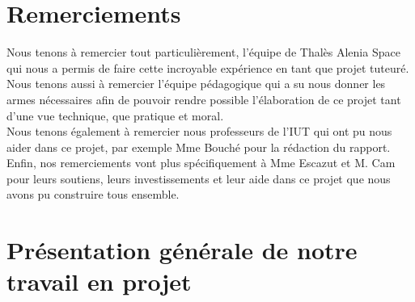 \documentclass{PackagerQualityN}
\begin{document}
\newp       %
\setcounter{tocdepth}{2}
\tableofcontents
{}









\newp       %
\paragraph{}

\section*{Remerciements}

Nous tenons à remercier tout particulièrement, l'équipe de Thalès Alenia Space qui nous a permis de faire cette incroyable expérience en tant que projet tuteuré. Nous tenons aussi à remercier l'équipe pédagogique qui a su nous donner les armes nécessaires afin de pouvoir rendre possible l'élaboration de ce projet tant d'une vue technique, que pratique et moral.\\

Nous tenons également à remercier nous professeurs de l'IUT qui ont pu nous aider dans ce projet, par exemple Mme Bouché pour la rédaction du rapport.\\

Enfin, nos remerciements vont plus spécifiquement à Mme Escazut et M. Cam pour leurs soutiens, leurs investissements et leur aide dans ce projet que nous avons pu construire tous ensemble.

\newp

\section*{Présentation générale de notre travail en projet}
\end{document}
